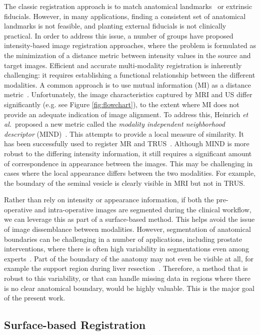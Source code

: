 \documentclass[journal]{IEEEtran}
\begin{document}
The classic registration approach is to match anatomical landmarks~\cite{Arun87a} or extrinsic fiducials. However, in many applications, finding a consistent set of anatomical landmarks is not feasible, and planting external fiducials is not clinically practical.  In order to address this issue, a number of groups have proposed intensity-based image registration approaches, where the problem is formulated as the minimization of a distance metric between intensity values in the source and target images.  Efficient and accurate multi-modality registration is inherently challenging: it requires establishing a functional relationship between the different modalities. A common approach is to use mutual information (MI) as a distance metric~\cite{Wells96a}.  Unfortunately, the image characteristics captured by MRI and US differ significantly (e.g. see Figure \ref{fig:flowchart}), to the extent where MI does not provide an adequate indication of image alignment. To address this, Heinrich \textit{et al.}~proposed a new metric called the \textit{modality independent neighborhood descriptor} (MIND)~\cite{Heinrich12a}.  This attempts to provide a local measure of similarity. It has been successfully used to register MR and TRUS~\cite{Sun13a}. Although MIND is more robust to the differing intensity information, it still requires a significant amount of correspondence in appearance between the images. This may be challenging in cases where the local appearance differs between the two modalities. For example, the boundary of the seminal vesicle is clearly visible in MRI but not in TRUS.

Rather than rely on intensity or appearance information, if both the pre-operative and intra-operative images are segmented during the clinical workflow, we can leverage this as part of a surface-based method.  This helps avoid the issue of image dissemblance between modalities. However, segmentation of anatomical boundaries can be challenging in a number of applications, including prostate interventions, where there is often high variability in segmentations even among experts~\cite{Smith07a}. Part of the boundary of the anatomy may not even be visible at all, for example the support region during liver resection~\cite{Cash05a,Rucker14a}. Therefore, a method that is robust to this variability, or that can handle missing data in regions where there is no clear anatomical boundary, would be highly valuable.  This is the major goal of the present work.

\subsection{Surface-based Registration}
\end{document}
